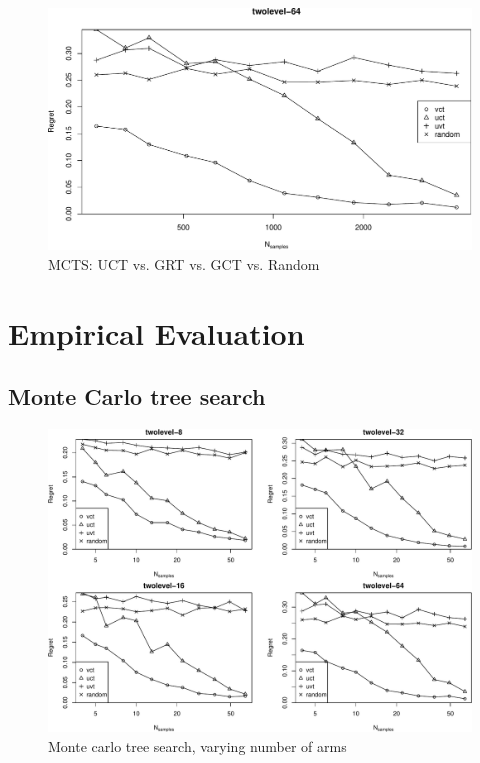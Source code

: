 \documentclass{article}
\begin{document}
\begin{figure}[t]
  \centering
  \includegraphics[scale=0.64,trim=0pt 0pt 0pt 24pt,clip]{twolevel-64.pdf}
  \caption{MCTS: UCT vs. GRT vs. GCT vs. Random}
  \label{fig:twolevel-64}
\end{figure}

\section{Empirical Evaluation}

\subsection{Monte Carlo tree search}

\begin{figure}[t]
  \centering
  \includegraphics[scale=0.64,trim=0pt 0pt 0pt 0pt,clip]{twolevel-8-16-32-64.pdf}
  \caption{Monte carlo tree search, varying number of arms}
  \label{fig:twolevel-8-16-32-64}
\end{figure}
\end{document}
